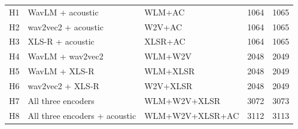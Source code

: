 \documentclass[11pt,a4paper]{article}
\begin{document}
\begin{center}
\begin{longtable}{>{\raggedright\arraybackslash}p{2.88cm}>{\raggedright\arraybackslash}p{2.88cm}>{\raggedright\arraybackslash}p{2.88cm}>{\raggedright\arraybackslash}p{2.88cm}>{\raggedleft\arraybackslash}p{2.88cm}}
\hspace{0pt}H1 & \hspace{0pt}WavLM +\allowbreak{} acoustic & \hspace{0pt}WLM+\allowbreak{}AC & \hspace{0pt}1064 & \hspace{0pt}1065\\
\hspace{0pt}H2 & \hspace{0pt}wav2vec2 +\allowbreak{} acoustic & \hspace{0pt}W2V+\allowbreak{}AC & \hspace{0pt}1064 & \hspace{0pt}1065\\
\hspace{0pt}H3 & \hspace{0pt}XLS-R +\allowbreak{} acoustic & \hspace{0pt}XLSR+\allowbreak{}AC & \hspace{0pt}1064 & \hspace{0pt}1065\\
\hspace{0pt}H4 & \hspace{0pt}WavLM +\allowbreak{} wav2vec2 & \hspace{0pt}WLM+\allowbreak{}W2V & \hspace{0pt}2048 & \hspace{0pt}2049\\
\hspace{0pt}H5 & \hspace{0pt}WavLM +\allowbreak{} XLS-R & \hspace{0pt}WLM+\allowbreak{}XLSR & \hspace{0pt}2048 & \hspace{0pt}2049\\
\hspace{0pt}H6 & \hspace{0pt}wav2vec2 +\allowbreak{} XLS-R & \hspace{0pt}W2V+\allowbreak{}XLSR & \hspace{0pt}2048 & \hspace{0pt}2049\\
\hspace{0pt}H7 & \hspace{0pt}All three encoders & \hspace{0pt}WLM+\allowbreak{}W2V+\allowbreak{}XLSR & \hspace{0pt}3072 & \hspace{0pt}3073\\
\hspace{0pt}H8 & \hspace{0pt}All three encoders +\allowbreak{} acoustic & \hspace{0pt}WLM+\allowbreak{}W2V+\allowbreak{}XLSR+\allowbreak{}AC & \hspace{0pt}3112 & \hspace{0pt}3113\\
\end{longtable}\end{center}
\end{document}
